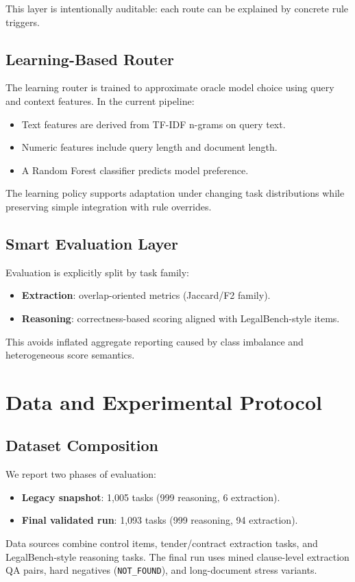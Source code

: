 This layer is intentionally auditable: each route can be explained by concrete rule triggers.

\subsection{Learning-Based Router}
The learning router is trained to approximate oracle model choice using query and context features. In the current pipeline:
\begin{itemize}[leftmargin=*]
  \item Text features are derived from TF-IDF n-grams on query text.
  \item Numeric features include query length and document length.
  \item A Random Forest classifier predicts model preference.
\end{itemize}
The learning policy supports adaptation under changing task distributions while preserving simple integration with rule overrides.

\subsection{Smart Evaluation Layer}
Evaluation is explicitly split by task family:
\begin{itemize}[leftmargin=*]
  \item \textbf{Extraction}: overlap-oriented metrics (Jaccard/F2 family).
  \item \textbf{Reasoning}: correctness-based scoring aligned with LegalBench-style items.
\end{itemize}
This avoids inflated aggregate reporting caused by class imbalance and heterogeneous score semantics.

\section{Data and Experimental Protocol}
\subsection{Dataset Composition}
We report two phases of evaluation:
\begin{itemize}[leftmargin=*]
  \item \textbf{Legacy snapshot}: 1,005 tasks (999 reasoning, 6 extraction).
  \item \textbf{Final validated run}: 1,093 tasks (999 reasoning, 94 extraction).
\end{itemize}
Data sources combine control items, tender/contract extraction tasks, and LegalBench-style reasoning tasks. The final run uses mined clause-level extraction QA pairs, hard negatives (\texttt{NOT\_FOUND}), and long-document stress variants.

